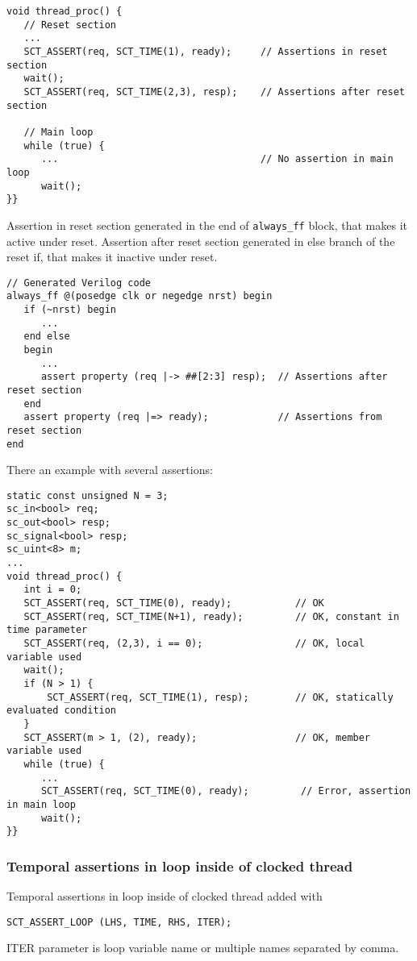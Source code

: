 \begin{lstlisting}[style=mycpp]
void thread_proc() {
   // Reset section
   ...
   SCT_ASSERT(req, SCT_TIME(1), ready);     // Assertions in reset section
   wait();                        
   SCT_ASSERT(req, SCT_TIME(2,3), resp);    // Assertions after reset section

   // Main loop 
   while (true) { 
      ...                                   // No assertion in main loop 
      wait();
}}
\end{lstlisting}

Assertion in reset section generated in the end of {\tt always\_ff} block, that makes it active under reset. Assertion after reset section generated in else branch of the reset if, that makes it inactive under reset.

\begin{lstlisting}[style=myverilog]
// Generated Verilog code
always_ff @(posedge clk or negedge nrst) begin
   if (~nrst) begin
      ...
   end else 
   begin 
      ... 
      assert property (req |-> ##[2:3] resp);  // Assertions after reset section 
   end 
   assert property (req |=> ready);            // Assertions from reset section 
end
\end{lstlisting}

There an example with several assertions:

\begin{lstlisting}[style=mycpp]
static const unsigned N = 3;
sc_in<bool> req;
sc_out<bool> resp;
sc_signal<bool> resp;
sc_uint<8> m;
...
void thread_proc() {
   int i = 0;
   SCT_ASSERT(req, SCT_TIME(0), ready);           // OK
   SCT_ASSERT(req, SCT_TIME(N+1), ready);         // OK, constant in time parameter
   SCT_ASSERT(req, (2,3), i == 0);                // OK, local variable used
   wait();
   if (N > 1) {
       SCT_ASSERT(req, SCT_TIME(1), resp);        // OK, statically evaluated condition
   }
   SCT_ASSERT(m > 1, (2), ready);                 // OK, member variable used
   while (true) {   
      ...
      SCT_ASSERT(req, SCT_TIME(0), ready);         // Error, assertion in main loop
      wait();
}}
\end{lstlisting}

\subsubsection{Temporal assertions in loop inside of clocked thread}

Temporal assertions in loop inside of clocked thread added with 
\begin{lstlisting}[style=mycpp]
SCT_ASSERT_LOOP (LHS, TIME, RHS, ITER);
\end{lstlisting}
%
ITER parameter is loop variable name or multiple names separated by comma.

